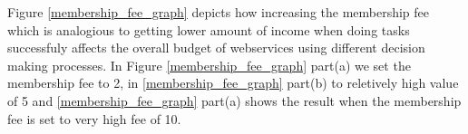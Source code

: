 \documentclass[runningheads,a4paper]{llncs}
\begin{document}

Figure \ref{membership_fee_graph} depicts how increasing the membership fee which is analogious to getting lower amount of income when doing tasks successfuly affects the overall budget of webservices using different decision making processes. In Figure \ref{membership_fee_graph} part(a) we set the membership fee to 2, in \ref{membership_fee_graph} part(b) to reletively high value of 5 and \ref{membership_fee_graph} part(a) shows the result when the membership fee is set to very high fee of 10. 
\end{document}
